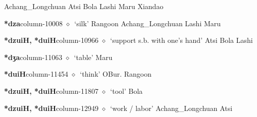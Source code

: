          Achang\_Longchuan 
\hspace{1ex}
         Atsi 
\hspace{1ex}
         Bola 
\hspace{1ex}
         Lashi 
\hspace{1ex}
         Maru 
\hspace{1ex}
         Xiandao 
  \item {\footnotesize \textbf{*dza}}{\tiny column-10008}
         $\diamond$~`silk'
         Rangoon 
\hspace{1ex}
         Achang\_Longchuan 
\hspace{1ex}
         Lashi 
\hspace{1ex}
         Maru 
  \item {\footnotesize \textbf{*dzuiH, *duiH}}{\tiny column-10966}
         $\diamond$~`support s.b. with one's hand'
         Atsi 
\hspace{1ex}
         Bola 
\hspace{1ex}
         Lashi 
  \item {\footnotesize \textbf{*dʒa}}{\tiny column-11063}
         $\diamond$~`table'
         Maru 
  \item {\footnotesize \textbf{*duiH}}{\tiny column-11454}
         $\diamond$~`think'
         OBur. 
\hspace{1ex}
         Rangoon 
  \item {\footnotesize \textbf{*dzuiH, *duiH}}{\tiny column-11807}
         $\diamond$~`tool'
         Bola 
  \item {\footnotesize \textbf{*dzuiH, *duiH}}{\tiny column-12949}
         $\diamond$~`work / labor'
         Achang\_Longchuan 
\hspace{1ex}
         Atsi 
